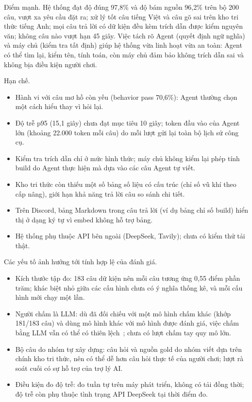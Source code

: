 Điểm mạnh. Hệ thống đạt độ đúng 97,8\% và độ bám nguồn 96,2\% trên bộ 200 câu, vượt xa yêu cầu đặt ra; xử lý tốt câu tiếng Việt và câu gõ sai trên kho tri thức tiếng Anh; mọi câu trả lời có dữ kiện đều kèm trích dẫn được kiểm nguyên văn; không câu nào vượt hạn 45 giây. Việc tách rõ Agent (quyết định ngữ nghĩa) và máy chủ (kiểm tra tất định) giúp hệ thống vừa linh hoạt vừa an toàn: Agent có thể tìm lại, kiểm tên, tính toán, còn máy chủ đảm bảo không trích dẫn sai và không bịa điều kiện người chơi.

Hạn chế.
\begin{itemize}
    \item Hành vi với câu mơ hồ còn yếu (behavior pass 70,6\%): Agent thường chọn một cách hiểu thay vì hỏi lại.
    \item Độ trễ p95 (15,1 giây) chưa đạt mục tiêu 10 giây; token đầu vào của Agent lớn (khoảng 22.000 token mỗi câu) do mỗi lượt gửi lại toàn bộ lịch sử công cụ.
    \item Kiểm tra trích dẫn chỉ ở mức hình thức; máy chủ không kiểm lại phép tính build do Agent thực hiện mà dựa vào các câu  Agent tự viết.
    \item Kho tri thức còn thiếu một số bảng số liệu có cấu trúc (chỉ số vũ khí theo cấp nâng), giới hạn khả năng trả lời câu so sánh chi tiết.
    \item Trên Discord, bảng Markdown trong câu trả lời (ví dụ bảng chỉ số build) hiển thị ở dạng ký tự vì embed không hỗ trợ bảng.
    \item Hệ thống phụ thuộc API bên ngoài (DeepSeek, Tavily); chưa có kiểm thử tải thật.
\end{itemize}

Các yếu tố ảnh hưởng tới tính hợp lệ của đánh giá.
\begin{itemize}
    \item Kích thước tập đo: 183 câu dữ kiện nên mỗi câu tương ứng 0,55 điểm phần trăm; khác biệt nhỏ giữa các cấu hình chưa có ý nghĩa thống kê, và mỗi cấu hình mới chạy một lần.
    \item Người chấm là LLM: dù đã đối chiếu với một mô hình chấm khác (khớp 181/183 câu) và dùng mô hình khác với mô hình được đánh giá, việc chấm bằng LLM vẫn có thể có thiên lệch~\cite{zheng2023judge}; chưa có lượt chấm tay quy mô lớn.
    \item Bộ câu do nhóm tự xây dựng: câu hỏi và nguồn gold do nhóm viết dựa trên chính kho tri thức, nên có thể dễ hơn câu hỏi thực tế của người chơi; lượt rà soát cuối có sự hỗ trợ của trợ lý AI.
    \item Điều kiện đo độ trễ: đo tuần tự trên máy phát triển, không có tải đồng thời; độ trễ còn phụ thuộc tình trạng API DeepSeek tại thời điểm đo.
\end{itemize}

